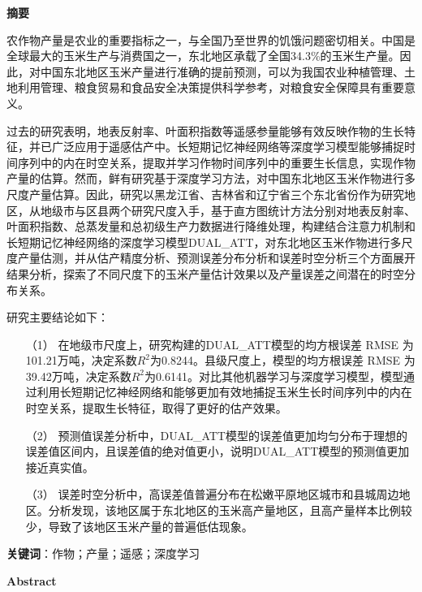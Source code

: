 \cleardoublepage{}
\begin{center}
    \bfseries {} 摘要
\end{center}

\par 农作物产量是农业的重要指标之一，与全国乃至世界的饥饿问题密切相关。中国是全球最大的玉米生产与消费国之一，东北地区承载了全国34.3\%的玉米生产量。因此，对中国东北地区玉米产量进行准确的提前预测，可以为我国农业种植管理、土地利用管理、粮食贸易和食品安全决策提供科学参考，对粮食安全保障具有重要意义。

\par 过去的研究表明，地表反射率、叶面积指数等遥感参量能够有效反映作物的生长特征，并已广泛应用于遥感估产中。长短期记忆神经网络等深度学习模型能够捕捉时间序列中的内在时空关系，提取并学习作物时间序列中的重要生长信息，实现作物产量的估算。然而，鲜有研究基于深度学习方法，对中国东北地区玉米作物进行多尺度产量估算。因此，研究以黑龙江省、吉林省和辽宁省三个东北省份作为研究地区，从地级市与区县两个研究尺度入手，基于直方图统计方法分别对地表反射率、叶面积指数、总蒸发量和总初级生产力数据进行降维处理，构建结合注意力机制和长短期记忆神经网络的深度学习模型DUAL\_ATT，对东北地区玉米作物进行多尺度产量估测，并从估产精度分析、预测误差分布分析和误差时空分析三个方面展开结果分析，探索了不同尺度下的玉米产量估计效果以及产量误差之间潜在的时空分布关系。

\par 研究主要结论如下：

\begin{itemize}
  \item [（1）] 在地级市尺度上，研究构建的DUAL\_ATT模型的均方根误差 RMSE 为101.21万吨，决定系数$R^2$为0.8244。县级尺度上，模型的均方根误差 RMSE 为 39.42万吨，决定系数$R^2$为0.6141。对比其他机器学习与深度学习模型，模型通过利用长短期记忆神经网络和能够更加有效地捕捉玉米生长时间序列中的内在时空关系，提取生长特征，取得了更好的估产效果。
  \item [（2）] 预测值误差分析中，DUAL\_ATT模型的误差值更加均匀分布于理想的误差值区间内，且误差值的绝对值更小，说明DUAL\_ATT模型的预测值更加接近真实值。
  \item [（3）] 误差时空分析中，高误差值普遍分布在松嫩平原地区城市和县城周边地区。分析发现，该地区属于东北地区的玉米高产量地区，且高产量样本比例较少，导致了该地区玉米产量的普遍低估现象。
\end{itemize}

\par \textbf{关键词}：作物；产量；遥感；深度学习

\cleardoublepage{}
\begin{center}
    \bfseries {} Abstract
\end{center}

